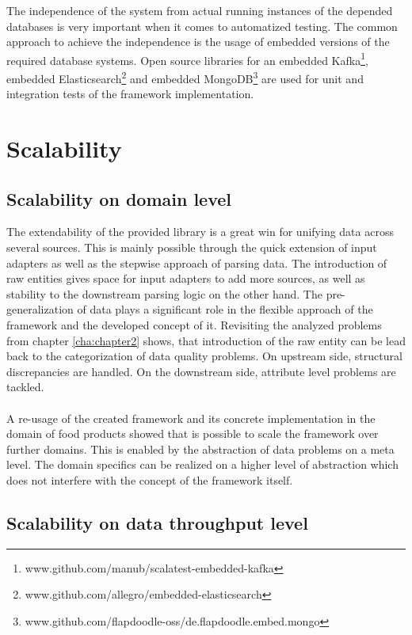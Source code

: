 The independence of the system from actual running instances of the depended databases is very important when it comes to automatized testing. The common approach to achieve the independence is the usage of embedded versions of the required database systems. Open source libraries for an embedded Kafka\footnote{www.github.com/manub/scalatest-embedded-kafka}, embedded Elasticsearch\footnote{www.github.com/allegro/embedded-elasticsearch} and embedded MongoDB\footnote{www.github.com/flapdoodle-oss/de.flapdoodle.embed.mongo} are used for unit and integration tests of the framework implementation.

\section{Scalability\label{sec:scal}}

\subsection{Scalability on domain level}

The extendability of the provided library is a great win for unifying data across several sources. This is mainly possible through the quick extension of input adapters as well as the stepwise approach of parsing data. The introduction of raw entities gives space for input adapters to add more sources, as well as stability to the downstream parsing logic on the other hand. The pre-generalization of data plays a significant role in the flexible approach of the framework and the developed concept of it. Revisiting the analyzed problems from chapter \ref{cha:chapter2} shows, that introduction of the raw entity can be lead back to the categorization of data quality problems. On upstream side, structural discrepancies are handled. On the downstream side, attribute level problems are tackled.
\\\\
A re-usage of the created framework and its concrete implementation in the domain of food products showed that is possible to scale the framework over further domains. This is enabled by the abstraction of data problems on a meta level. The domain specifics can be realized on a higher level of abstraction which does not interfere with the concept of the framework itself.

\subsection{Scalability on data throughput level}


